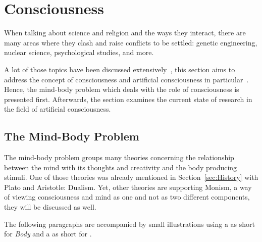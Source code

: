 \section{Consciousness}
\label{sec:Consciousness}

When talking about science and religion and the ways they interact, there are many areas where they clash and raise conflicts to be settled: genetic engineering, nuclear science, psychological studies, and more.

A lot of those topics have been discussed extensively~\cite{barbour1993ethics,pfleiderer2010genethics,chernus1991nuclear}, this section aims to address the concept of consciousness and artificial consciousness in particular~\cite{buttazzo2001artificial,chella2013artificial}.
Hence, the mind-body problem which deals with the role of consciousness is presented first.
Afterwards, the section examines the current state of research in the field of artificial consciousness.

\def\lmibop#1{\texttt{[image: figures/asq\_mibop\_\#1-compressed.pdf]}}

\newcommand*\moppreview[2]{\needspace{3\baselineskip}\paragraph[#2]{\smash{\raisebox{-2.3\baselineskip}{\lmibop{#1}}} #2}%
\parshape=4
0cm \linewidth
1.65cm \dimexpr\linewidth-1.65cm\relax
1.5cm \dimexpr\linewidth-1.5cm\relax
0cm \linewidth}

\subsection{The Mind-Body Problem}
\label{subsec:mind-body}The mind-body problem groups many theories concerning the relationship between the mind with its thoughts and creativity and the body producing stimuli.
One of those theories was already mentioned in Section~\ref{sec:History} with Plato and Aristotle: Dualism.
Yet, other theories are supporting Monism, a way of viewing consciousness and mind as one and not as two different components, they will be discussed as well.

The following paragraphs are accompanied by small illustrations using a  as short for \emph{Body} and a  as short for .


